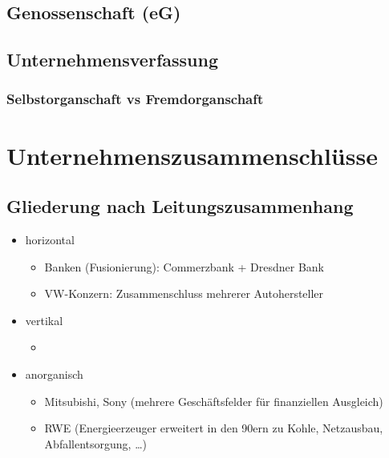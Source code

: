 \subsection{Genossenschaft (eG)}

\subsection{Unternehmensverfassung}
\subsubsection{Selbstorganschaft vs Fremdorganschaft}

\section{Unternehmenszusammenschlüsse}
\subsection{Gliederung nach Leitungszusammenhang}
\begin{itemize}
\item horizontal
\begin{itemize}
\item Banken (Fusionierung): Commerzbank + Dresdner Bank
\item VW-Konzern: Zusammenschluss mehrerer Autohersteller
\end{itemize}
\item vertikal
\begin{itemize}
\item 
\end{itemize}
\item anorganisch
\begin{itemize}
\item Mitsubishi, Sony (mehrere Geschäftsfelder für finanziellen Ausgleich)
\item RWE (Energieerzeuger erweitert in den 90ern zu Kohle, Netzausbau, Abfallentsorgung, …)
\end{itemize}
\end{itemize}

